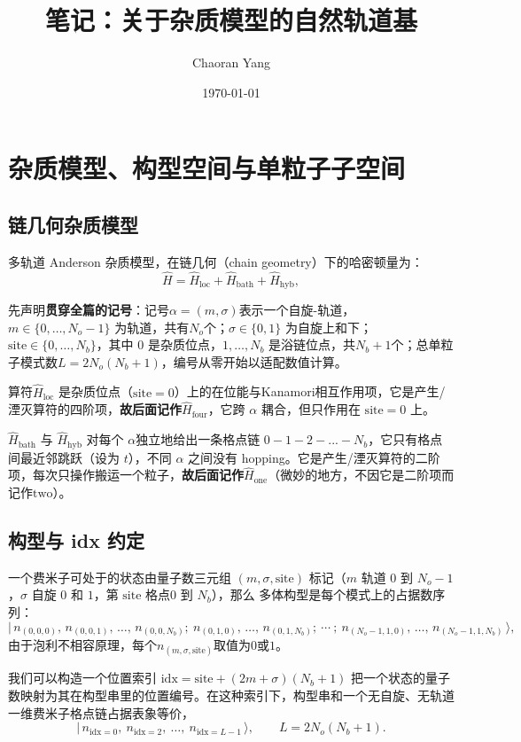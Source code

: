 \documentclass[11pt]{ctexart}
\title{笔记：关于杂质模型的自然轨道基}
\author{Chaoran Yang}
\date{\today}
\begin{document}
\maketitle


\medskip
\section{杂质模型、构型空间与单粒子子空间}

\subsection{链几何杂质模型}

多轨道 Anderson 杂质模型，在链几何（chain geometry）下的哈密顿量为：
\[
\hat H=\hat H_{\mathrm{loc}}+\hat H_{\mathrm{bath}}+\hat H_{\mathrm{hyb}},
\]

先声明\textbf{贯穿全篇的记号}：记号$\alpha=(m,\sigma)$表示一个自旋-轨道，$m\in\{0,\dots,N_o-1\}$ 为轨道，共有$N_o$个；$\sigma\in\{0,1\}$ 为自旋上和下；$\mathrm{site}\in\{0,\dots,N_b\}$，其中 $0$ 是杂质位点，$1,\dots,N_b$ 是浴链位点，共$N_b+1个$；总单粒子模式数$L=2N_o(N_b+1)$，编号从零开始以适配数值计算。

算符$\hat H_{\mathrm{loc}}$ 是杂质位点（$\mathrm{site}=0$）上的在位能与Kanamori相互作用项，它是产生/湮灭算符的四阶项，\textbf{故后面记作}$\hat{H}_{\mathrm{four}}$，它跨 $\alpha$ 耦合，但只作用在 $\mathrm{site}=0$ 上。

$\hat H_{\mathrm{bath}}$ 与 $\hat H_{\mathrm{hyb}}$ 对每个 $\alpha$独立地给出一条格点链 $0-1-2-...-N_b$，它只有格点间最近邻跳跃（设为 $t$），不同 $\alpha$ 之间没有 hopping。它是产生/湮灭算符的二阶项，每次只操作搬运一个粒子，\textbf{故后面记作}$\hat{H}_{\mathrm{one}}$（微妙的地方，不因它是二阶项而记作$\mathrm{two}$）。


\subsection{构型与 idx 约定}

一个费米子可处于的状态由量子数三元组 $(m,\sigma,\mathrm{site})$ 标记（$m$ 轨道 $0$ 到 $N_o-1$，$\sigma$ 自旋 $0$ 和 $1$，第 $\mathrm{site}$ 格点$0$ 到 $N_b$），那么
多体构型是每个模式上的占据数序列：
\[
|\,n_{(0,0,0)},\,n_{(0,0,1)},\,\dots,\,n_{(0,0,N_b)}
;\ n_{(0,1,0)},\,\dots,\,n_{(0,1,N_b)}
;\ \cdots\
;\ n_{(N_o-1,1,0)},\,\dots,\,n_{(N_o-1,1,N_b)}\,\rangle,
\]
由于泡利不相容原理，每个$n_{(m,\sigma,\mathrm{site})}$取值为$0$或$1$。

我们可以构造一个位置索引 $\mathrm{idx}=\mathrm{site}+(2m+\sigma)(N_b+1)$ 把一个状态的量子数映射为其在构型串里的位置编号。在这种索引下，构型串和一个无自旋、无轨道一维费米子格点链占据表象等价，
\[
|\,n_{\mathrm{idx}=0},\ n_{\mathrm{idx}=2},\ \dots,\ n_{\mathrm{idx}=L-1}\,\rangle,
\qquad L=2N_o(N_b+1).
\]
\end{document}
